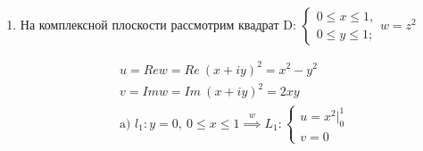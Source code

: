 \documentclass[../../main.tex]{subfiles}
\begin{document}
\begin{examples}
\begin{enumerate}
\[\begin{gathered}
\text{Длина }L \stackrel{\eqref{lec30:1}}{=}
\left[
  \begin{array}{ccc}
     f^\prime\left(z\right) = \left(z^2\right) = 2z
  \end{array}
\right]
= \int\limits_l{2|z|\ |dz|} = 
\left[
  \begin{array}{ccc}
     z = 1 + iy\\
     y|_{-1}^1
  \end{array}
\right]
=  
\left[
  \begin{array}{ccc}
     |z| = \sqrt{1 + y^2}\\
     dz = idy \implies |dz| = dy
  \end{array}
\right]\\
= 2 \int\limits_{-1}^1{\sqrt{1 + y^2}\ dy} = 
4\int\limits_0^1{\sqrt{1 + y^2}\ dy} = 4
\left[
  \begin{array}{ccc}
     \sqrt{1 + y^2} + \ln(y + \sqrt{1 + y^2})
  \end{array}
\right]_0^1 = 
4(\sqrt{2} + \ln(1 + \sqrt{2}))
\end{gathered}\]


\item На комплексной плоскости рассмотрим квадрат D:
$\begin{cases}
    0 \leq x \leq 1,\\
    0 \leq y \leq 1;
\end{cases} w = z^2$



\[\begin{gathered}
u = Re w = Re\ (x + iy)^2 = x^2 - y^2 \\
v = Im w = Im\ (x + iy)^2 = 2xy\\
    \text{a) }  l_1: y = 0,\ 0 \leq x \leq 1 \stackrel{w}{\implies}
L_1:
\begin{cases}
    u = x^2|_0^1\\
    v = 0
\end{cases}
\end{gathered}\]



\end{enumerate}
\end{examples}
\end{document}
